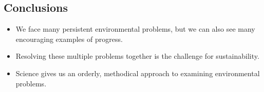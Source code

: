 \documentclass[10pt]{article}
\begin{document}
\subsection{Conclusions}
\begin{itemize}
    \item We face many persistent environmental problems, but we can also see many encouraging examples of progress.
    \item \color{Red} Resolving these multiple problems together is the challenge for sustainability.\color{Black}
    \item Science gives us an orderly, methodical approach to examining environmental problems. 
\end{itemize}
\end{document}
